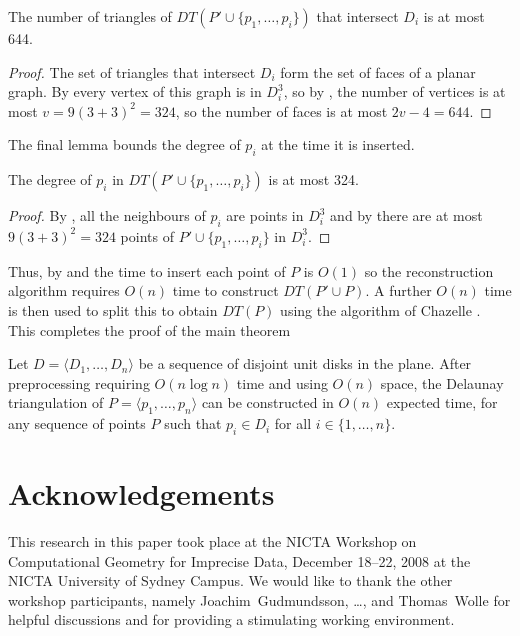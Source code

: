 \documentclass[lotsofwhite]{patmorin}
\begin{document}
\begin{lem}
The number of triangles of $DT(P'\cup\{p_1,\ldots,p_i\})$ that
intersect $D_i$ is at most 644.
\end{lem}

\begin{proof}
The set of triangles that intersect $D_i$ form the set of faces of a
planar graph.  By  every vertex of this graph is in
$D_i^3$, so by , the number of vertices 
is at most $v=9(3+3)^2=324$, so the number of faces is at most
$2v-4=644$. 
\end{proof}

The final lemma bounds the degree of $p_i$ at the time it is inserted.

\begin{lem}
The degree of $p_i$ in $DT(P'\cup\{p_1,\ldots,p_i\})$ is at most 324.
\end{lem}

\begin{proof}
By , all the neighbours of $p_i$ are points in $D_i^3$
and by  there are at most $9(3+3)^2=324$ points
of $P'\cup\{p_1,\ldots,p_i\}$ in $D_i^3$.
\end{proof}

Thus, by  and  the time to insert
each point of $P$ is $O(1)$ so the reconstruction algorithm requires
$O(n)$ time to construct $DT(P'\cup P)$.  A further $O(n)$ time is
then used to split this to obtain $DT(P)$ using the algorithm of
Chazelle \etal.  This completes the proof of the main theorem

\begin{thm}
Let $D=\langle D_1,\ldots,D_n\rangle$ be a sequence of disjoint unit
disks in the plane.  After preprocessing requiring $O(n\log n)$ time
and using $O(n)$ space, the Delaunay triangulation of $P=\langle
p_1,\ldots,p_n\rangle$ can be constructed in $O(n)$ expected time, for any
sequence of points $P$ such that $p_i\in D_i$ for all
$i\in\{1,\ldots,n\}$.
\end{thm}

\section*{Acknowledgements}

This research in this paper took place at the NICTA Workshop on
Computational Geometry for Imprecise Data, December 18--22, 2008 at
the NICTA University of Sydney Campus.  We would like to thank the
other workshop participants, namely
Joachim~Gudmundsson,
\ldots,
and
Thomas~Wolle
for helpful discussions and for providing a stimulating working
environment.



\end{document}
